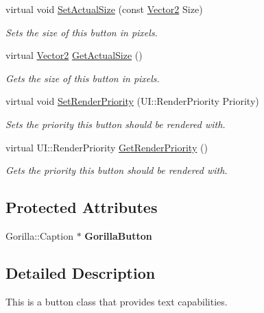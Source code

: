 \begin{DoxyCompactItemize}
virtual void \hyperlink{classphys_1_1UI_1_1TextButton_a7ed2be5c895c7fe01d7650746ccc57e9}{SetActualSize} (const \hyperlink{classphys_1_1Vector2}{Vector2} Size)
\begin{DoxyCompactList}\small\item\em Sets the size of this button in pixels. \item\end{DoxyCompactList}\item 
virtual \hyperlink{classphys_1_1Vector2}{Vector2} \hyperlink{classphys_1_1UI_1_1TextButton_a062b31c199f875d4f825f6be1d11fb55}{GetActualSize} ()
\begin{DoxyCompactList}\small\item\em Gets the size of this button in pixels. \item\end{DoxyCompactList}\item 
virtual void \hyperlink{classphys_1_1UI_1_1TextButton_a7d4e22acd792b10f2f7986d8f449ec16}{SetRenderPriority} (UI::RenderPriority Priority)
\begin{DoxyCompactList}\small\item\em Sets the priority this button should be rendered with. \item\end{DoxyCompactList}\item 
virtual UI::RenderPriority \hyperlink{classphys_1_1UI_1_1TextButton_ad339621af6e73ff9702c0dd4cdadbb73}{GetRenderPriority} ()
\begin{DoxyCompactList}\small\item\em Gets the priority this button should be rendered with. \item\end{DoxyCompactList}\end{DoxyCompactItemize}
\subsection*{Protected Attributes}
\begin{DoxyCompactItemize}
\item 
\hypertarget{classphys_1_1UI_1_1TextButton_a33fe39747602f948b462e008cb75bb5e}{
Gorilla::Caption $\ast$ {\bfseries GorillaButton}}
\label{df/d03/classphys_1_1UI_1_1TextButton_a33fe39747602f948b462e008cb75bb5e}

\end{DoxyCompactItemize}


\subsection{Detailed Description}
This is a button class that provides text capabilities. 

